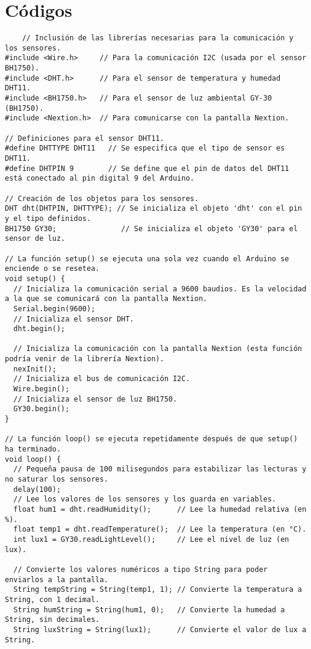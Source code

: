 \section{Códigos}
\begin{listing}[H]
  \scriptsize
  \begin{verbatim}
    // Inclusión de las librerías necesarias para la comunicación y los sensores.
#include <Wire.h>     // Para la comunicación I2C (usada por el sensor BH1750).
#include <DHT.h>      // Para el sensor de temperatura y humedad DHT11.
#include <BH1750.h>   // Para el sensor de luz ambiental GY-30 (BH1750).
#include <Nextion.h>  // Para comunicarse con la pantalla Nextion.

// Definiciones para el sensor DHT11.
#define DHTTYPE DHT11   // Se especifica que el tipo de sensor es DHT11.
#define DHTPIN 9        // Se define que el pin de datos del DHT11 está conectado al pin digital 9 del Arduino.

// Creación de los objetos para los sensores.
DHT dht(DHTPIN, DHTTYPE); // Se inicializa el objeto 'dht' con el pin y el tipo definidos.
BH1750 GY30;               // Se inicializa el objeto 'GY30' para el sensor de luz.

// La función setup() se ejecuta una sola vez cuando el Arduino se enciende o se resetea.
void setup() {
  // Inicializa la comunicación serial a 9600 baudios. Es la velocidad a la que se comunicará con la pantalla Nextion.
  Serial.begin(9600);
  // Inicializa el sensor DHT.
  dht.begin();

  // Inicializa la comunicación con la pantalla Nextion (esta función podría venir de la librería Nextion).
  nexInit();
  // Inicializa el bus de comunicación I2C.
  Wire.begin();
  // Inicializa el sensor de luz BH1750.
  GY30.begin();
}

// La función loop() se ejecuta repetidamente después de que setup() ha terminado.
void loop() {
  // Pequeña pausa de 100 milisegundos para estabilizar las lecturas y no saturar los sensores.
  delay(100);
  // Lee los valores de los sensores y los guarda en variables.
  float hum1 = dht.readHumidity();      // Lee la humedad relativa (en %).
  float temp1 = dht.readTemperature();  // Lee la temperatura (en °C).
  int lux1 = GY30.readLightLevel();     // Lee el nivel de luz (en lux).

  // Convierte los valores numéricos a tipo String para poder enviarlos a la pantalla.
  String tempString = String(temp1, 1); // Convierte la temperatura a String, con 1 decimal.
  String humString = String(hum1, 0);   // Convierte la humedad a String, sin decimales.
  String luxString = String(lux1);      // Convierte el valor de lux a String.


\end{verbatim}
\end{listing}
